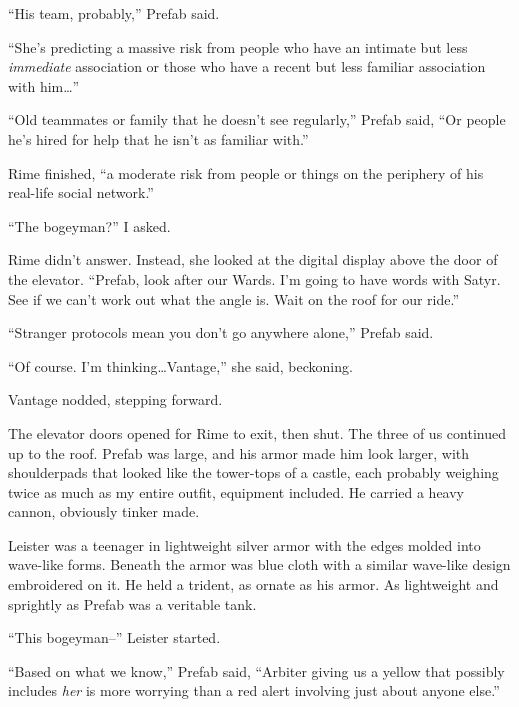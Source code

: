 ``His team, probably,'' Prefab said.



``She's predicting a massive risk from people who have an intimate but less \emph{immediate} association or those who have a recent but less familiar association with him\ldots''



``Old teammates or family that he doesn't see regularly,'' Prefab said, ``Or people he's hired for help that he isn't as familiar with.''



Rime finished, ``\ldotsAnd a moderate risk from people or things on the periphery of his real-life social network.''



``The bogeyman?'' I asked.



Rime didn't answer.  Instead, she looked at the digital display above the door of the elevator.  ``Prefab, look after our Wards.  I'm going to have words with Satyr.  See if we can't work out what the angle is.  Wait on the roof for our ride.''



``Stranger protocols mean you don't go anywhere alone,'' Prefab said.



``Of course.  I'm thinking\ldots  Vantage,'' she said, beckoning.



Vantage nodded, stepping forward.



The elevator doors opened for Rime to exit, then shut.  The three of us continued up to the roof.  Prefab was large, and his armor made him look larger, with shoulderpads that looked like the tower-tops of a castle, each probably weighing twice as much as my entire outfit, equipment included.  He carried a heavy cannon, obviously tinker made.



Leister was a teenager in lightweight silver armor with the edges molded into wave-like forms.  Beneath the armor was blue cloth with a similar wave-like design embroidered on it.  He held a trident, as ornate as his armor.  As lightweight and sprightly as Prefab was a veritable tank.



``This bogeyman--'' Leister started.



``Based on what we know,'' Prefab said, ``Arbiter giving us a yellow that possibly includes \emph{her} is more worrying than a red alert involving just about anyone else.''



